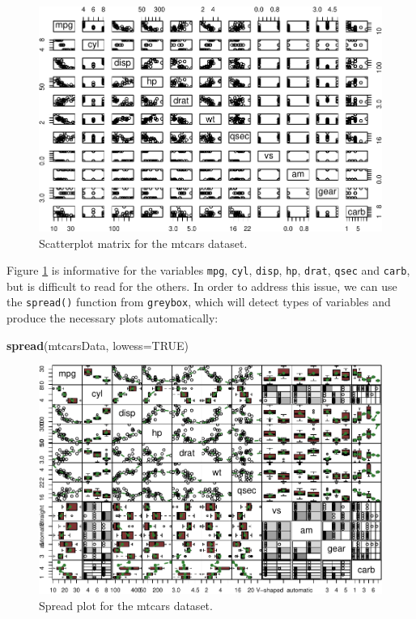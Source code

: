\documentclass[
]{book}
\newenvironment{Shaded}{\begin{snugshade}}{\end{snugshade}}
\newcommand{\AttributeTok}[1]{\textcolor[rgb]{0.13,0.29,0.53}{#1}}
\newcommand{\ConstantTok}[1]{\textcolor[rgb]{0.56,0.35,0.01}{#1}}
\newcommand{\FunctionTok}[1]{\textcolor[rgb]{0.13,0.29,0.53}{\textbf{#1}}}
\newcommand{\NormalTok}[1]{#1}
\theoremstyle{definition}
\theoremstyle{definition}
\theoremstyle{definition}
\theoremstyle{definition}
\theoremstyle{remark}
\begin{document}
\begin{figure}
\centering
\includegraphics{Svetunkov---Statistics-for-Business-Analytics_files/figure-latex/scatterMatrix-1.pdf}
\caption{\label{fig:scatterMatrix}Scatterplot matrix for the mtcars dataset.}
\end{figure}

Figure \ref{fig:scatterMatrix} is informative for the variables \texttt{mpg}, \texttt{cyl}, \texttt{disp}, \texttt{hp}, \texttt{drat}, \texttt{qsec} and \texttt{carb}, but is difficult to read for the others. In order to address this issue, we can use the \texttt{spread()} function from \texttt{greybox}, which will detect types of variables and produce the necessary plots automatically:

\begin{Shaded}
\begin{Highlighting}[]
\FunctionTok{spread}\NormalTok{(mtcarsData, }\AttributeTok{lowess=}\ConstantTok{TRUE}\NormalTok{)}
\end{Highlighting}
\end{Shaded}

\begin{figure}
\centering
\includegraphics{Svetunkov---Statistics-for-Business-Analytics_files/figure-latex/spreadPlot-1.pdf}
\caption{\label{fig:spreadPlot}Spread plot for the mtcars dataset.}
\end{figure}
\end{document}
